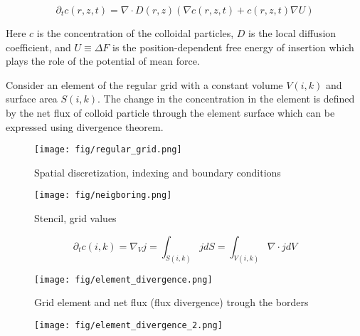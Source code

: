 \documentclass[12pt, a4paper]{article}
\begin{document}
\begin{equation}
    \partial_{t} c(r,z,t) = \nabla \cdot D(r,z)(\nabla c(r, z, t) +  c(r, z, t) \nabla U)
\end{equation}

Here $c$ is the concentration of the colloidal particles, $D$ is the local diffusion coefficient, and $U \equiv \Delta F$ is the position-dependent free energy of insertion which plays the role of the potential of mean force.


Consider an element of the regular grid with a constant volume $V(i,k)$ and surface area $S(i,k)$.
The change in the concentration in the element is defined by the net flux of colloid particle through the element surface which can be expressed using divergence theorem.

\begin{figure}
    \centering
    \texttt{[image: fig/regular\_grid.png]}
    \caption{Spatial discretization, indexing and boundary conditions}
\end{figure}

\begin{figure}
    \centering
    \texttt{[image: fig/neigboring.png]}
    \caption{Stencil, grid values}
\end{figure}

\begin{equation}
    \partial_{t}c(i,k) = \nabla_{V} j = \int_{S(i,k)} j dS = \int_{V(i,k)} \nabla \cdot j dV
\end{equation}


\begin{figure}
    \centering
    \texttt{[image: fig/element\_divergence.png]}
    \caption{Grid element and net flux (flux divergence) trough the borders}
\end{figure}

\begin{figure}
    \centering
    \texttt{[image: fig/element\_divergence\_2.png]}
\end{figure}
\end{document}
